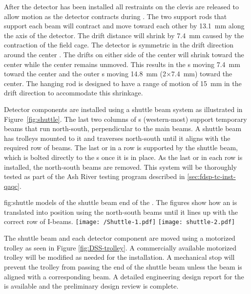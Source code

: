After the detector has been installed all restraints on the clevis are released to allow motion as the detector contracts during \cooldown.  The two support rods that support each  beam will contract and move toward each other by \SI{13.1}{mm} along the axis of the detector.  
The drift distance will shrink by \SI{7.4}{mm}  caused by the contraction of the field cage.  The detector is symmetric in the drift direction around the center .  The drifts on either side of the center  will  shrink toward the center while the center  remains unmoved.  This results in the s moving \SI{7.4}{mm}  toward the center and the outer s moving \SI{14.8}{mm}  (2$\times$\SI{7.4}{mm}) toward the center.  The hanging rod is designed to have a range of motion of \SI{15}{mm}  in the drift direction to accommodate this shrinkage.




Detector components are installed using a shuttle beam system as
illustrated in Figure~\ref{fig:shuttle}.  
The last two columns of \fdth{}s (western-most) support temporary beams that run
north-south, perpendicular to the main  beams.  
A shuttle beam has trolleys mounted to it and traverses 
north-south until it aligns with the required row of  beams.  
The last  or  in a row is supported by the shuttle beam, which is bolted directly to the \fdth{}s once it is in place.  
As the last  or  in each row is installed, the north-south beams are removed. This system will be thoroughly tested as part of the Ash River testing program described in \ref{sec:fdsp-tc-inst-qaqc}.

\begin{dunefigure}{fig:shuttle}
  {\threed models of the shuttle beam end of the . The figures show how an 
is translated into position using the north-south beams until it lines up with the correct
row of I-beams.}
\texttt{[image: /Shuttle-1.pdf]}
 \texttt{[image: shuttle-2.pdf]}
\end{dunefigure}

The shuttle beam and each detector component are moved using a motorized trolley as seen in Figure \ref{fig:DSS-trolley}.  A commercially available motorized trolley will be modified as needed for the installation. A mechanical stop will prevent the trolley from passing the end of the shuttle beam unless the beam is aligned with a corresponding  beam. A detailed engineering design report for the  is available \cite{bib:docdb6260} and the preliminary design review is complete.

